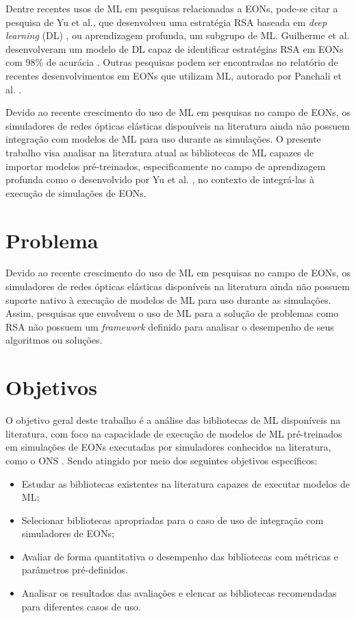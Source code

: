 Dentre recentes usos de ML em pesquisas relacionadas a EONs, pode-se citar a pesquisa de Yu et al., que desenvolveu uma estratégia RSA baseada em \textit{deep learning} (DL) \cite{eon_ml_rsa_dl_2019}, ou aprendizagem profunda, um subgrupo de ML. Guilherme et al. desenvolveram um modelo de DL capaz de identificar estratégias RSA em EONs com 98\% de acurácia \cite{eon_ml_classifier_2020}. Outras pesquisas podem ser encontradas no relatório de recentes desenvolvimentos em EONs que utilizam ML, autorado por Panchali et al. \cite{eon_ml_recent_2019}.

Devido ao recente crescimento do uso de ML em pesquisas no campo de EONs, os simuladores de redes ópticas elásticas disponíveis na literatura ainda não possuem integração com modelos de ML para uso durante as simulações. O presente trabalho visa analisar na literatura atual as bibliotecas de ML capazes de importar modelos pré-treinados, especificamente no campo de aprendizagem profunda como o desenvolvido por Yu et al. \cite{eon_ml_rsa_dl_2019}, no contexto de integrá-las à execução de simulações de EONs.

\section{Problema}
\label{intro-problem}

Devido ao recente crescimento do uso de ML em pesquisas no campo de EONs, os simuladores de redes ópticas elásticas disponíveis na literatura ainda não possuem suporte nativo à execução de modelos de ML para uso durante as simulações. Assim, pesquisas que envolvem o uso de ML para a solução de problemas como RSA não possuem um \textit{framework} definido para analisar o desempenho de seus algoritmos ou soluções.

\section{Objetivos}
\label{intro-goals}

O objetivo geral deste trabalho é a análise das bibliotecas de ML disponíveis na literatura, com foco na capacidade de execução de modelos de ML pré-treinados em simulações de EONs executadas por simuladores conhecidos na literatura, como o ONS \cite{costa2016ons}. Sendo atingido por meio dos seguintes objetivos específicos:

\begin{itemize}
  \item Estudar as bibliotecas existentes na literatura capazes de executar modelos de ML;
  \item Selecionar bibliotecas apropriadas para o caso de uso de integração com simuladores de EONs;
  \item Avaliar de forma quantitativa o desempenho das bibliotecas com métricas e parâmetros pré-definidos.
  \item Analisar os resultados das avaliações e elencar as bibliotecas recomendadas para diferentes casos de uso.
\end{itemize}

